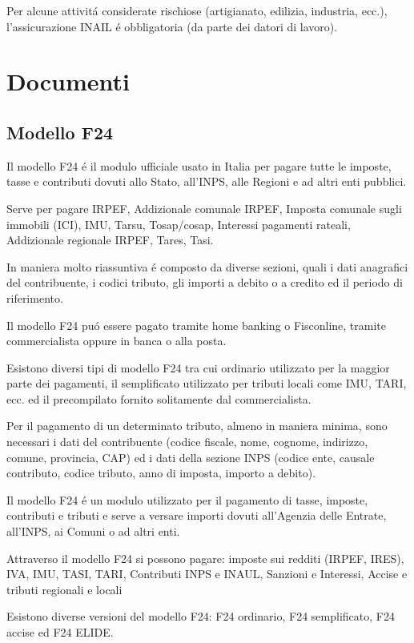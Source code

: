 \documentclass{article}
\begin{document}
Per alcune attivit\'a considerate rischiose (artigianato, edilizia, industria, ecc.), l'assicurazione INAIL \'e obbligatoria (da parte dei datori di lavoro).

\section{Documenti}

\subsection{Modello F24}
Il modello F24 \'e il modulo ufficiale usato in Italia per pagare tutte le imposte, tasse e contributi dovuti allo Stato, all'INPS, alle Regioni e ad altri enti pubblici.

Serve per pagare IRPEF, Addizionale comunale IRPEF, Imposta comunale sugli immobili (ICI), IMU, Tarsu, Tosap/cosap, Interessi pagamenti rateali, Addizionale regionale IRPEF, Tares, Tasi.

In maniera molto riassuntiva \'e composto da diverse sezioni, quali i dati anagrafici del contribuente, i codici tributo, gli importi a debito o a credito ed il periodo di riferimento.

Il modello F24 pu\'o essere pagato tramite home banking o Fisconline, tramite commercialista oppure in banca o alla posta.

Esistono diversi tipi di modello F24 tra cui ordinario utilizzato per la maggior parte dei pagamenti, il semplificato utilizzato per tributi locali come IMU, TARI, ecc. ed il precompilato fornito solitamente dal commercialista.

Per il pagamento di un determinato tributo, almeno in maniera minima, sono necessari i dati del contribuente (codice fiscale, nome, cognome, indirizzo, comune, provincia, CAP) 
ed i dati della sezione INPS (codice ente, causale contributo, codice tributo, anno di imposta, importo a debito).   

Il modello F24 \'e un modulo utilizzato per il pagamento di tasse, imposte, contributi e tributi e serve a versare importi dovuti all'Agenzia delle Entrate, all'INPS, ai Comuni o ad altri enti. 

Attraverso il modello F24 si possono pagare: imposte sui redditi (IRPEF, IRES), IVA, IMU, TASI, TARI, Contributi INPS e INAUL, Sanzioni e Interessi, Accise e tributi regionali e locali

Esistono diverse versioni del modello F24: F24 ordinario, F24 semplificato, F24 accise ed F24 ELIDE.
\end{document}
